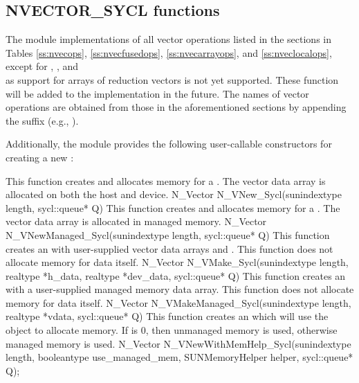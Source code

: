 \subsection{NVECTOR\_SYCL functions}
\label{ss:nvec_sycl_functions}

The {\nvecsycl} module implementations of all vector operations listed in the
sections in Tables \ref{ss:nvecops}, \ref{ss:nvecfusedops},
\ref{ss:nvecarrayops}, and \ref{ss:nveclocalops}, except for
, , and \\ \noindent
{} as support for arrays of reduction vectors is
not yet supported. These function will be added to the {\nvecsycl}
implementation in the future. The names of vector operations are obtained from
those in the aforementioned sections by appending the suffix  (e.g.,
).

Additionally, the {\nvecsycl} module provides the following user-callable
constructors for creating a new {\nvecsycl}:

{
  This function creates and allocates memory for a {\sycl} .
  The vector data array is allocated on both the host and device.
}
{
  N\_Vector N\_VNew\_Sycl(sunindextype length, sycl::queue* Q)
}
{
  This function creates and allocates memory for a {\sycl} .
  The vector data array is allocated in managed memory.
}
{
  N\_Vector N\_VNewManaged\_Sycl(sunindextype length, sycl::queue* Q)
}
{
  This function creates an {\nvecsycl} with user-supplied vector data arrays
   and . This function does not allocate memory for
  data itself.
}
{
  N\_Vector N\_VMake\_Sycl(sunindextype length, realtype *h\_data,
   realtype *dev\_data, sycl::queue* Q)
}
{
  This function creates an {\nvecsycl} with a user-supplied managed memory data
  array. This function does not allocate memory for data itself.
}
{
  N\_Vector N\_VMakeManaged\_Sycl(sunindextype length, realtype *vdata,
   sycl::queue* Q)
}
{
  This function creates an {\nvecsycl} which will use the 
  object to allocate memory. If  is 0, then unmanaged
  memory is used, otherwise managed memory is used.
}
{
  N\_Vector N\_VNewWithMemHelp\_Sycl(sunindextype length,
   booleantype use\_managed\_mem,
   SUNMemoryHelper helper, sycl::queue* Q);
}

